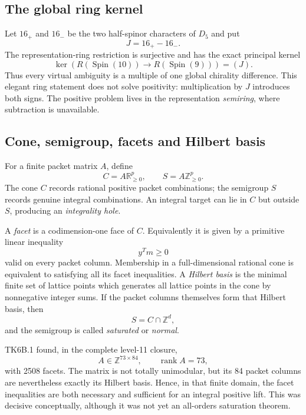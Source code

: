 \documentclass[11pt,a4paper]{article}
\theoremstyle{definition}
\newcommand{\Spin}{\operatorname{Spin}}
\begin{document}
\subsection{The global ring kernel}

Let $16_+$ and $16_-$ be the two half-spinor characters of $D_5$ and put
\[
   J=16_+-16_-.
\]
The representation-ring restriction is surjective and has the exact
principal kernel
\begin{equation}
\label{eq:principal-kernel}
   \ker\!\left(R(\Spin(10))\longrightarrow R(\Spin(9))\right)=(J).
\end{equation}
Thus every virtual ambiguity is a multiple of one global chirality
difference.  This elegant ring statement does not solve positivity:
multiplication by $J$ introduces both signs.  The positive problem lives in
the representation \emph{semiring}, where subtraction is unavailable.

\subsection{Cone, semigroup, facets and Hilbert basis}

For a finite packet matrix $A$, define
\[
   C=A\mathbb R_{\geq0}^{p},
   \qquad
   S=A\mathbb Z_{\geq0}^{p}.
\]
The cone $C$ records rational positive packet combinations; the semigroup
$S$ records genuine integral combinations.  An integral target can lie in
$C$ but outside $S$, producing an \emph{integrality hole}.

A \emph{facet} is a codimension-one face of $C$.  Equivalently it is given by
a primitive linear inequality
\[
   y^Tm\geq0
\]
valid on every packet column.  Membership in a full-dimensional rational
cone is equivalent to satisfying all its facet inequalities.  A
\emph{Hilbert basis} is the minimal finite set of lattice points which
generates all lattice points in the cone by nonnegative integer sums.  If the
packet columns themselves form that Hilbert basis, then
\[
   S=C\cap\mathbb Z^d,
\]
and the semigroup is called \emph{saturated} or \emph{normal}.

TK6B.1 found, in the complete level-11 closure,
\[
   A\in\mathbb Z^{73\times84},
   \qquad \operatorname{rank}A=73,
\]
with 2508 facets.  The matrix is not totally unimodular, but its 84 packet
columns are nevertheless exactly its Hilbert basis.  Hence, in that finite
domain, the facet inequalities are both necessary and sufficient for an
integral positive lift.  This was decisive conceptually, although it was not
yet an all-orders saturation theorem.
\end{document}
